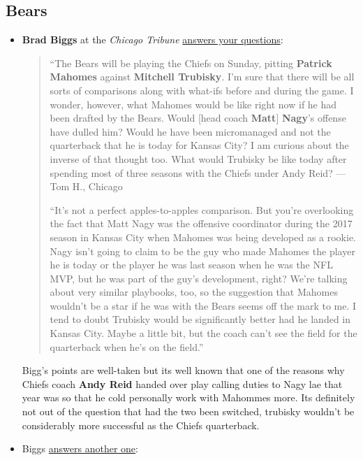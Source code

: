 \documentclass[11pt]{article}
\author{Tom Shannon}
\date{\today}
\title{}
\begin{document}
\subsection{Bears}
\begin{itemize}
\item \textbf{Brad Biggs} at the \textit{Chicago Tribune} \href{https://www.chicagotribune.com/sports/bears/ct-cb-chicago-bears-mailbag-mitch-trubisky-offensive-line-20191218-33a7ey47aja67p27sh2t5kwube-story.html}{answers your questions}:

\begin{quote}
  ``The Bears will be playing the Chiefs on Sunday, pitting \textbf{Patrick Mahomes} against \textbf{Mitchell Trubisky}. I’m sure that there will be all sorts of comparisons along with what-ifs before and during the game. I wonder, however, what Mahomes would be like right now if he had been drafted by the Bears. Would [head coach \textbf{Matt}] \textbf{Nagy}’s offense have dulled him? Would he have been micromanaged and not the quarterback that he is today for Kansas City? I am curious about the inverse of that thought too. What would Trubisky be like today after spending most of three seasons with the Chiefs under Andy Reid? — Tom H., Chicago

``It’s not a perfect apples-to-apples comparison. But you’re overlooking the fact that Matt Nagy was the offensive coordinator during the 2017 season in Kansas City when Mahomes was being developed as a rookie. Nagy isn’t going to claim to be the guy who made Mahomes the player he is today or the player he was last season when he was the NFL MVP, but he was part of the guy’s development, right? We’re talking about very similar playbooks, too, so the suggestion that Mahomes wouldn’t be a star if he was with the Bears seems off the mark to me. I tend to doubt Trubisky would be significantly better had he landed in Kansas City. Maybe a little bit, but the coach can’t see the field for the quarterback when he’s on the field.''
\end{quote}

Bigg's points are well-taken but its well known that one of the reasons why Chiefs coach \textbf{Andy Reid} handed over play calling duties to Nagy lae that year was so that he cold personally work with Mahommes more.  Its definitely not out of the question that had the two been switched, trubisky wouldn't be considerably more successful as the Chiefs quarterback. 

\item Biggs \href{https://www.chicagotribune.com/sports/bears/ct-cb-chicago-bears-mailbag-mitch-trubisky-offensive-line-20191218-33a7ey47aja67p27sh2t5kwube-story.html}{answers another one}:


\end{itemize}
\end{document}
